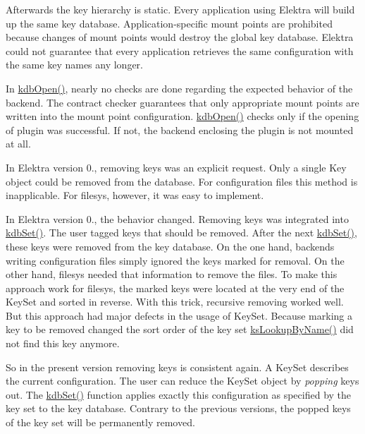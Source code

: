 Afterwards the key hierarchy is static. Every application using Elektra will build up the same key database. Application-\/specific mount points are prohibited because changes of mount points would destroy the global key database. Elektra could not guarantee that every application retrieves the same configuration with the same key names any longer.

In {\ttfamily \mbox{\hyperlink{group__kdb_ga6808defe5870f328dd17910aacbdc6ca}{kdb\+Open()}}}, nearly no checks are done regarding the expected behavior of the backend. The contract checker guarantees that only appropriate mount points are written into the mount point configuration. {\ttfamily \mbox{\hyperlink{group__kdb_ga6808defe5870f328dd17910aacbdc6ca}{kdb\+Open()}}} checks only if the opening of plugin was successful. If not, the backend enclosing the plugin is not mounted at all.

In Elektra version 0., removing keys was an explicit request. Only a single {\ttfamily Key} object could be removed from the database. For configuration files this method is inapplicable. For {\ttfamily filesys}, however, it was easy to implement.

In Elektra version 0., the behavior changed. Removing keys was integrated into {\ttfamily \mbox{\hyperlink{group__kdb_ga11436b058408f83d303ca5e996832bcf}{kdb\+Set()}}}. The user tagged keys that should be removed. After the next {\ttfamily \mbox{\hyperlink{group__kdb_ga11436b058408f83d303ca5e996832bcf}{kdb\+Set()}}}, these keys were removed from the key database. On the one hand, backends writing configuration files simply ignored the keys marked for removal. On the other hand, {\ttfamily filesys} needed that information to remove the files. To make this approach work for {\ttfamily filesys}, the marked keys were located at the very end of the {\ttfamily Key\+Set} and sorted in reverse. With this trick, recursive removing worked well. But this approach had major defects in the usage of {\ttfamily Key\+Set}. Because marking a key to be removed changed the sort order of the key set {\ttfamily \mbox{\hyperlink{group__keyset_gad2e30fb6d4739d917c5abb2ac2f9c1a1}{ks\+Lookup\+By\+Name()}}} did not find this key anymore.

So in the present version removing keys is consistent again. A {\ttfamily Key\+Set} describes the current configuration. The user can reduce the {\ttfamily Key\+Set} object by {\itshape popping} keys out. The {\ttfamily \mbox{\hyperlink{group__kdb_ga11436b058408f83d303ca5e996832bcf}{kdb\+Set()}}} function applies exactly this configuration as specified by the key set to the key database. Contrary to the previous versions, the popped keys of the key set will be permanently removed.

